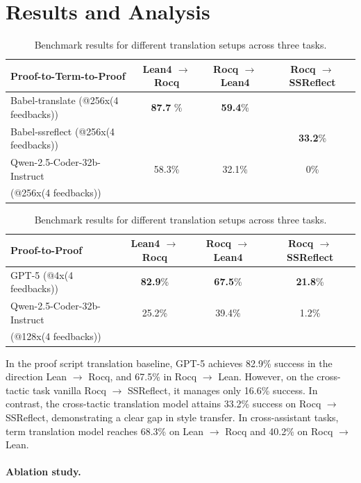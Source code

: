 \documentclass{article}
\begin{document}
\section{Results and Analysis}
\begin{table}[h]
	\centering
	
	\begin{tabular}{lccc}
		\hline
		\textbf{Proof-to-Term-to-Proof} & \textbf{Lean4 $\to$ Rocq} & \textbf{Rocq $\to$ Lean4} & \textbf{Rocq $\to$ SSReflect} \\
		\hline
		Babel-translate (@256x(4 feedbacks))            & \textbf{87.7} \% & \textbf{59.4}\% &  \\
		Babel-ssreflect (@256x(4 feedbacks))            &  &  & \textbf{33.2}\% \\
		Qwen-2.5-Coder-32b-Instruct  & 58.3\% & 32.1\% & 0\% \\
		(@256x(4 feedbacks)) & & & \\
		\hline
	\end{tabular} \vspace{1ex}
	
	\begin{tabular}{lccc}
		\hline
		\textbf{Proof-to-Proof} & \textbf{Lean4 $\to$ Rocq} & \textbf{Rocq $\to$ Lean4}  & \textbf{Rocq $\to$ SSReflect}  \\
		\hline
		GPT-5 (@4x(4 feedbacks)) & \textbf{82.9}\% & \textbf{67.5}\% & \textbf{21.8}\% \\
		Qwen-2.5-Coder-32b-Instruct  & 25.2\% & 39.4\% & 1.2\% \\
		(@128x(4 feedbacks)) & & & \\
		\hline
	\end{tabular} \vspace{1ex}
	
	\caption{Benchmark results for different translation setups across three tasks.}
	\label{tab:translation_results}
\end{table}


In the proof script translation baseline, GPT-5 achieves 82.9\% success in the direction Lean $\to$ Rocq, and 67.5\% in Rocq $\to$ Lean. However, on the cross-tactic task vanilla Rocq $\to$ SSReflect, it manages only 16.6\% success.
%
In contrast, the cross-tactic translation model attains 33.2\% success on Rocq $\to$ SSReflect, demonstrating a clear gap in style transfer. In cross-assistant tasks, term translation model reaches 68.3\% on Lean $\to$ Rocq and 40.2\% on Rocq $\to$ Lean.

\paragraph*{Ablation study.}
\end{document}
